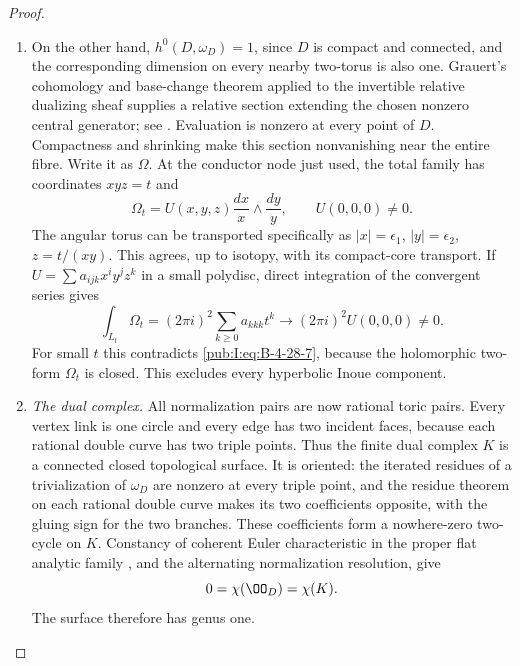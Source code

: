 \begin{proof}
\begin{enumerate}[label=\arabic*.,leftmargin=*]
\item On the other hand, $h^0(D,\omega_D)=1$, since $D$ is
compact and connected, and the corresponding dimension
on every nearby two-torus is also one. Grauert's
cohomology and base-change theorem applied to the
invertible relative dualizing sheaf supplies a relative
section extending the chosen nonzero central generator;
see \citet[Chapter~III, Theorem~4.12(ii), pp.~134--135]{BS76}.
Evaluation is
nonzero at every point of $D$. Compactness and shrinking
make this section nonvanishing near the entire fibre.
Write it as $\Omega$. At the conductor node just used,
the total family has coordinates $xyz=t$ and
\begin{equation}
 \Omega_t=U(x,y,z)\frac{dx}{x}\wedge\frac{dy}{y},
 \qquad U(0,0,0)\ne0.
\label{pub:I:eq:B-4-28-8}
\end{equation}
The angular torus can be transported specifically as
$|x|=\epsilon_1$, $|y|=\epsilon_2$, $z=t/(xy)$.
This agrees, up to isotopy, with its compact-core
transport. If $U=\sum a_{ijk}x^iy^jz^k$ in a small
polydisc, direct integration of the convergent series
gives
\begin{equation}
 \int_{L_t}\Omega_t
   =(2\pi i)^2\sum_{k\ge0}a_{kkk}t^k
   \longrightarrow(2\pi i)^2U(0,0,0)\ne0.
\label{pub:I:eq:B-4-28-9}
\end{equation}
For small $t$ this contradicts \eqref{pub:I:eq:B-4-28-7}, because
the holomorphic two-form $\Omega_t$ is closed. This
excludes every hyperbolic Inoue component.

\item \emph{The dual complex.}
All normalization pairs are now rational toric pairs.
Every vertex link is one circle and every edge has
two incident faces, because each rational double
curve has two triple points. Thus the finite dual
complex $K$ is a connected closed topological surface.
It is oriented: the iterated residues of a
trivialization of $\omega_D$ are nonzero at every
triple point, and the residue theorem on each rational
double curve makes its two coefficients opposite,
with the gluing sign for the two branches. These
coefficients form a nowhere-zero two-cycle on $K$.
Constancy of coherent Euler characteristic in the
proper flat analytic family
\citep[Chapter~III, Theorem~4.12(iii), pp.~134--135]{BS76}, and the alternating
normalization resolution, give
\begin{equation}
 0=\chi(\OO_D)=\chi(K).
\label{pub:I:eq:B-4-28-10}
\end{equation}
The surface therefore has genus one.


\end{enumerate}
\end{proof}
